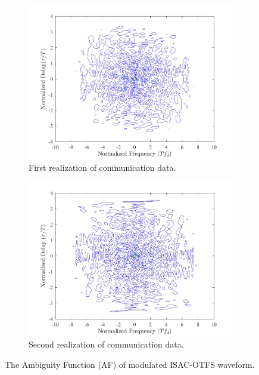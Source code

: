 \documentclass[journal, comsoc]{IEEEtran}
\begin{document}
\begin{figure}%
     \centering
     \begin{subfigure}[t]{0.45\textwidth}
         \centering
         \includegraphics[width=\textwidth]{Figures/Contour_4QAM_OTFS_M4_N8_Example1.pdf}
         \caption{First realization of communication data.}
     \end{subfigure}
     \hfill
     \begin{subfigure}[t]{0.45\textwidth}
         \centering
         \includegraphics[width=\textwidth]{Figures/Contour_4QAM_OTFS_M4_N8_Example2.pdf}
         \caption{Second realization of communication data.}
     \end{subfigure}
     \hfill
        \caption{The Ambiguity Function (AF) of modulated ISAC-OTFS waveform.}
        \label{figure_OTFS_1}
        \vspace{-3mm}
\end{figure}
\end{document}
